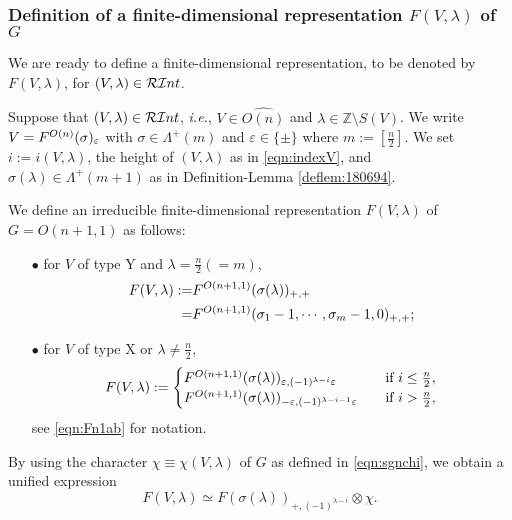 \subsubsection{Definition of a finite-dimensional representation $F(V,\lambda)$
 of $G$}
We are ready to define a finite-dimensional representation, 
 to be denoted by $F(V,\lambda)$, 
 for $(V,\lambda)\in {\mathcal{RI}}nt$.  

\begin{definition}
\label{def:Fshift}
Suppose that  $(V,\lambda) \in {\mathcal{RI}}nt$,
{\it{i.e.}},
 $V \in \widehat{O(n)}$ and $\lambda \in {\mathbb{Z}} \setminus S(V)
$.  
We write $V=F^{{O(n)}}({\sigma})_{\varepsilon}$
 with $\sigma \in \Lambda^+(m)$
 and $\varepsilon \in \{\pm\}$
 where $m:=[\frac n 2]$.  
We set $i:=i(V,\lambda)$, 
 the height of $(V,\lambda)$
 as in \eqref{eqn:indexV}, 
 and 
$
\sigma(\lambda) \in \Lambda^+(m+1)
$
as in Definition-Lemma \ref{deflem:180694}.  



We define an irreducible finite-dimensional representation
 $F(V, \lambda)$ of $G=O(n+1,1)$
 as follows:
\begin{enumerate}
\item[$\bullet$]
for $V$ of type Y
 and $\lambda=\frac n 2 (=m)$, 
\begin{align*}
F(V,\lambda):=& F^{{O(n+1,1)}}({\sigma(\lambda)})_{+,+}
\\
             =& F^{{O(n+1,1)}}({\sigma_1-1, \cdots,\sigma_m-1,0})_{+,+};
\end{align*}
\item[$\bullet$]
for $V$ of type X
 or $\lambda \ne \frac n 2$, 
\begin{equation}
\label{eqn:FVlmd}
   F(V,\lambda)
:=
\begin{cases}
F^{{O(n+1,1)}}({\sigma(\lambda)})_{\varepsilon,(-1)^{\lambda-i}\varepsilon}
\quad
&\text{if $i \le \frac n 2$}, 
\\
F^{{O(n+1,1)}}({\sigma(\lambda)})_{-\varepsilon,(-1)^{\lambda-i-1}\varepsilon}
\quad
&\text{if $i > \frac n 2$}, 
\end{cases}
\end{equation}
see \eqref{eqn:Fn1ab} for notation.  
\end{enumerate}



By using the character $\chi \equiv \chi(V,\lambda)$ of $G$
 as defined in \eqref{eqn:sgnchi}, 
 we obtain a unified expression
\begin{equation}
\label{eqn:FVchi}
F(V,\lambda) \simeq F(\sigma(\lambda))_{+,(-1)^{\lambda-i}} \otimes \chi.
\end{equation}
\end{definition}

